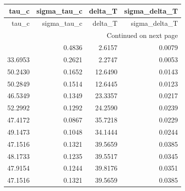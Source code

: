 \begin{longtable}{rrrr}
\toprule
tau_c & sigma_tau_c & delta_T & sigma_delta_T \\
\midrule
\endfirsthead
\toprule
tau_c & sigma_tau_c & delta_T & sigma_delta_T \\
\midrule
\endhead
\midrule
\multicolumn{4}{r}{Continued on next page} \\
\midrule
\endfoot
\bottomrule
\endlastfoot
55.2084 & 0.4836 & 2.6157 & 0.0079 \\
33.6953 & 0.2621 & 2.2747 & 0.0053 \\
50.2430 & 0.1652 & 12.6490 & 0.0143 \\
50.2849 & 0.1514 & 12.6445 & 0.0123 \\
46.5349 & 0.1349 & 23.3357 & 0.0217 \\
52.2992 & 0.1292 & 24.2590 & 0.0239 \\
47.4172 & 0.0867 & 35.7218 & 0.0229 \\
49.1473 & 0.1048 & 34.1444 & 0.0244 \\
47.1516 & 0.1321 & 39.5659 & 0.0385 \\
48.1733 & 0.1235 & 39.5517 & 0.0345 \\
47.9154 & 0.1244 & 39.8176 & 0.0351 \\
47.1516 & 0.1321 & 39.5659 & 0.0385 \\
\end{longtable}
